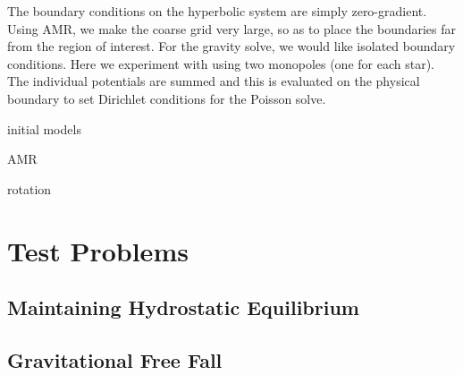 \documentclass[12pt,preprint]{aastex}
\begin{document}
The boundary conditions on the hyperbolic system are simply
zero-gradient.  Using AMR, we make the coarse grid very large, so as
to place the boundaries far from the region of interest.  For the
gravity solve, we would like isolated boundary conditions.  Here we
experiment with using two monopoles (one for each star).  The
individual potentials are summed and this is evaluated on the physical
boundary to set Dirichlet conditions for the Poisson solve.


initial models

AMR

rotation


\section{Test Problems}\label{Sec:Tests}

\subsection{Maintaining Hydrostatic Equilibrium}\label{Sec:HSE}

\subsection{Gravitational Free Fall}\label{Sec:Gravitational Free Fall}
\end{document}
